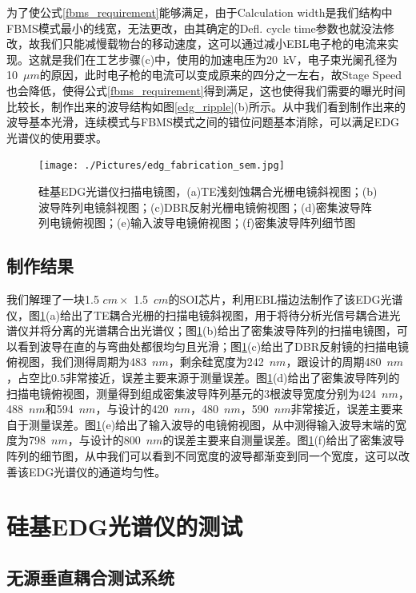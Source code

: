 为了使公式\ref{fbms_requirement}能够满足，由于Calculation width是我们结构中FBMS模式最小的线宽，无法更改，由其确定的Defl. cycle time参数也就没法修改，故我们只能减慢载物台的移动速度，这可以通过减小EBL电子枪的电流来实现。这就是我们在工艺步骤(c)中，使用的加速电压为20~kV，电子束光阑孔径为10~$\mu m$的原因，此时电子枪的电流可以变成原来的四分之一左右，故Stage Speed也会降低，使得公式\ref{fbms_requirement}得到满足，这也使得我们需要的曝光时间比较长，制作出来的波导结构如图\ref{edg_ripple}(b)所示。从中我们看到制作出来的波导基本光滑，连续模式与FBMS模式之间的错位问题基本消除，可以满足EDG光谱仪的使用要求。

\begin{figure}[htb]
	\centering
	\texttt{[image: ./Pictures/edg\_fabrication\_sem.jpg]}
	\captionsetup{justification=centering}
	\caption{硅基EDG光谱仪扫描电镜图，(a)TE浅刻蚀耦合光栅电镜斜视图；(b)波导阵列电镜斜视图；(c)DBR反射光栅电镜俯视图；(d)密集波导阵列电镜俯视图；(e)输入波导电镜俯视图；(f)密集波导阵列细节图}
	\label{edg_fabrication_sem}
\end{figure}

\subsection{制作结果}
我们解理了一块1.5 $cm\times$  1.5~$cm$的SOI芯片，利用EBL描边法制作了该EDG光谱仪，图\ref{edg_fabrication_sem}(a)给出了TE耦合光栅的扫描电镜斜视图，用于将待分析光信号耦合进光谱仪并将分离的光谱耦合出光谱仪；图\ref{edg_fabrication_sem}(b)给出了密集波导阵列的扫描电镜图，可以看到波导在直的与弯曲处都很均匀且光滑；图\ref{edg_fabrication_sem}(c)给出了DBR反射镜的扫描电镜俯视图，我们测得周期为483~$nm$，剩余硅宽度为242~$nm$，跟设计的周期480~$nm$，占空比0.5非常接近，误差主要来源于测量误差。图\ref{edg_fabrication_sem}(d)给出了密集波导阵列的扫描电镜俯视图，测量得到组成密集波导阵列基元的3根波导宽度分别为424~$nm$，488~$nm$和594~$nm$，与设计的420~$nm$，480~$nm$，590~$nm$非常接近，误差主要来自于测量误差。图\ref{edg_fabrication_sem}(e)给出了输入波导的电镜俯视图，从中测得输入波导末端的宽度为798~$nm$，与设计的800~$nm$的误差主要来自测量误差。图\ref{edg_fabrication_sem}(f)给出了密集波导阵列的细节图，从中我们可以看到不同宽度的波导都渐变到同一个宽度，这可以改善该EDG光谱仪的通道均匀性。

\section{硅基EDG光谱仪的测试}
\subsection{无源垂直耦合测试系统}

